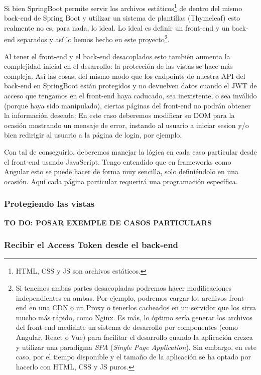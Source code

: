 \documentclass[a4paper,12pt]{report}
\begin{document}
			Si bien SpringBoot permite servir los archivos estáticos\footnote{HTML, CSS y JS son archivos estáticos.}  de dentro del mismo back-end de Spring Boot y utilizar un sistema de plantillas (Thymeleaf) esto realmente no es, para nada, lo ideal. Lo ideal es definir un front-end y un back-end separados y así lo hemos hecho en este proyecto\footnote{Si tenemos ambas partes desacopladas podremos hacer modificaciones independientes en ambas. Por ejemplo, podremos cargar los archivos front-end en una CDN o un Proxy o tenerlos cacheados en un servidor que los sirva mucho más rápido, como Nginx. Es más, lo óptimo sería generar los archivos del front-end mediante un sistema de desarrollo por componentes (como Angular, React o Vue) para facilitar el desarrollo cuando la aplicación crezca y utilizar una paradigma \textit{SPA} (\textit{Single Page Application}). Sin embargo, en este caso, por el tiempo disponible y el tamaño de la aplicación se ha optado por hacerlo con HTML, CSS y JS puros.}.

			
			
			Al tener el front-end y el back-end desacoplados esto también aumenta la complejidad inicial en el desarrollo: la protección de las vistas se hace más compleja. Así las cosas, del mismo modo que los endpoints de nuestra API del back-end en SpringBoot están protegidos y no devuelven datos cuando el JWT de acceso que tengamos en el front-end haya caducado, sea inexistente, o sea inválido (porque haya sido manipulado), ciertas páginas del front-end no podrán obtener la información deseada: En este caso deberemos modificar su DOM para la ocasión mostrando un mensaje de error, instando al usuario a iniciar sesion y/o bien redirigir al usuario a la página de login, por ejemplo.
			
			Con tal de conseguirlo, deberemos manejar la lógica en cada caso particular desde el front-end usando JavaScript. Tengo entendido que en frameworks como Angular esto se puede hacer de forma muy sencilla, solo definiéndolo en una ocasión. Aquí cada página particular requerirá una programación específica.
			
			\subsubsection{Protegiendo las vistas}
			
			\textbf{TO DO: POSAR EXEMPLE DE CASOS PARTICULARS}
			
			\subsubsection{Recibir el Access Token desde el back-end}
			\label{sec:recibirAccesTokenENFRONTEND}
			
\end{document}
